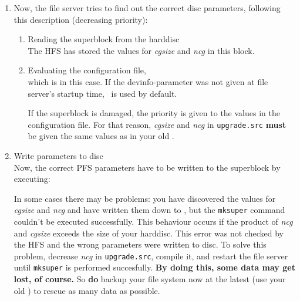 \begin{enumerate}
  \item  Now, the file server tries to find out the correct disc parameters,
         following this description (decreasing priority):

         \begin{enumerate}

           \item Reading the superblock from the harddisc \\
                 The HFS has stored the values for {\it cgsize} and {\it ncg} in
                 this block.

           \item Evaluating the configuration file, \\
                 which is  in this case. If the
                 devinfo-parameter was not given at file server's startup
                 time, \HEDI\ is used by default.

                 \begin{caution}
                   If the superblock is damaged, the priority is given to the
                   values in the configuration file. For that reason,
                   {\it cgsize} and {\it ncg} in {\tt upgrade.src} {\bf must}
                   be given the same values as in your old \DIS.
                 \end{caution}

         \end{enumerate}

  \item Write parameters to disc \\
        Now, the correct PFS parameters have to be written to the superblock
        by executing:


        In some cases there may be problems: you have discovered the values 
        for {\it cgsize} and {\it ncg} and have written them down to \DI, but
        the {\tt mksuper} command couldn't be executed successfully. This
        behaviour occurs if the product of {\it ncg} and {\it cgsize} exceeds
        the size of your harddisc. This error was not checked by the HFS and
        the wrong parameters were written to disc. To solve this problem,
        decrease {\it ncg} in {\tt upgrade.src}, compile it, and restart the
        file server until {\tt mksuper} is performed succesfully. {\bf By
        doing this, some data may get lost, of course.} So {\bf do} backup
        your file system now at the latest (use your old \DI) to rescue as
        many data as possible.

\end{enumerate}
